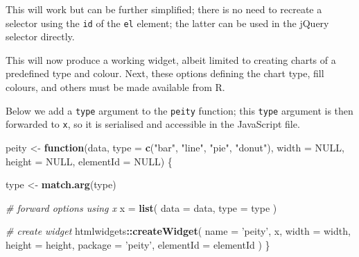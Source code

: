 \documentclass[10pt,]{krantz}
\makeatletter
\newenvironment{Shaded}{\begin{snugshade}}{\end{snugshade}}
\newcommand{\AttributeTok}[1]{\textcolor[rgb]{0.61,0.61,0.61}{#1}}
\newcommand{\CommentTok}[1]{\textcolor[rgb]{0.37,0.37,0.37}{\textit{#1}}}
\newcommand{\ControlFlowTok}[1]{\textcolor[rgb]{0.27,0.27,0.27}{\textbf{#1}}}
\newcommand{\DataTypeTok}[1]{\textcolor[rgb]{0.27,0.27,0.27}{#1}}
\newcommand{\KeywordTok}[1]{\textcolor[rgb]{0.27,0.27,0.27}{\textbf{#1}}}
\newcommand{\NormalTok}[1]{#1}
\newcommand{\OperatorTok}[1]{\textcolor[rgb]{0.43,0.43,0.43}{\textbf{#1}}}
\newcommand{\OtherTok}[1]{\textcolor[rgb]{0.37,0.37,0.37}{#1}}
\newcommand{\StringTok}[1]{\textcolor[rgb]{0.5,0.5,0.5}{#1}}
\newenvironment{kframe}{%
\medskip{}
\setlength{\fboxsep}{.8em}
 \def\at@end@of@kframe{}%
 \ifinner\ifhmode%
  \def\at@end@of@kframe{\end{minipage}}%
  \begin{minipage}{\columnwidth}%
 \fi\fi%
 \def\FrameCommand##1{\hskip\@totalleftmargin \hskip-\fboxsep
 \colorbox{shadecolor}{##1}\hskip-\fboxsep
     \hskip-\linewidth \hskip-\@totalleftmargin \hskip\columnwidth}%
 \MakeFramed {\advance\hsize-\width
   \@totalleftmargin\z@ \linewidth\hsize
   \@setminipage}}%
 {\par\unskip\endMakeFramed%
 \at@end@of@kframe}
\renewenvironment{Shaded}{\begin{kframe}}{\end{kframe}}
\makeatother
\begin{document}
This will work but can be further simplified; there is no need to recreate a selector using the \texttt{id} of the \texttt{el} element; the latter can be used in the jQuery selector directly.

\begin{Shaded}
\end{Shaded}

This will now produce a working widget, albeit limited to creating charts of a predefined type and colour. Next, these options defining the chart type, fill colours, and others must be made available from R.

Below we add a \texttt{type} argument to the \texttt{peity} function; this \texttt{type} argument is then forwarded to \texttt{x}, so it is serialised and accessible in the JavaScript file.

\begin{Shaded}
\begin{Highlighting}[]
\NormalTok{peity <-}\StringTok{ }\ControlFlowTok{function}\NormalTok{(data, }\DataTypeTok{type =} \KeywordTok{c}\NormalTok{(}\StringTok{"bar"}\NormalTok{, }\StringTok{"line"}\NormalTok{, }\StringTok{"pie"}\NormalTok{, }\StringTok{"donut"}\NormalTok{), }
  \DataTypeTok{width =} \OtherTok{NULL}\NormalTok{, }\DataTypeTok{height =} \OtherTok{NULL}\NormalTok{, }\DataTypeTok{elementId =} \OtherTok{NULL}\NormalTok{) \{}

\NormalTok{  type <-}\StringTok{ }\KeywordTok{match.arg}\NormalTok{(type)}

  \CommentTok{# forward options using x}
\NormalTok{  x =}\StringTok{ }\KeywordTok{list}\NormalTok{(}
    \DataTypeTok{data =}\NormalTok{ data,}
    \DataTypeTok{type =}\NormalTok{ type}
\NormalTok{  )}

  \CommentTok{# create widget}
\NormalTok{  htmlwidgets}\OperatorTok{::}\KeywordTok{createWidget}\NormalTok{(}
    \DataTypeTok{name =} \StringTok{'peity'}\NormalTok{,}
\NormalTok{    x,}
    \DataTypeTok{width =}\NormalTok{ width,}
    \DataTypeTok{height =}\NormalTok{ height,}
    \DataTypeTok{package =} \StringTok{'peity'}\NormalTok{,}
    \DataTypeTok{elementId =}\NormalTok{ elementId}
\NormalTok{  )}
\NormalTok{\}}
\end{Highlighting}
\end{Shaded}
\end{document}
